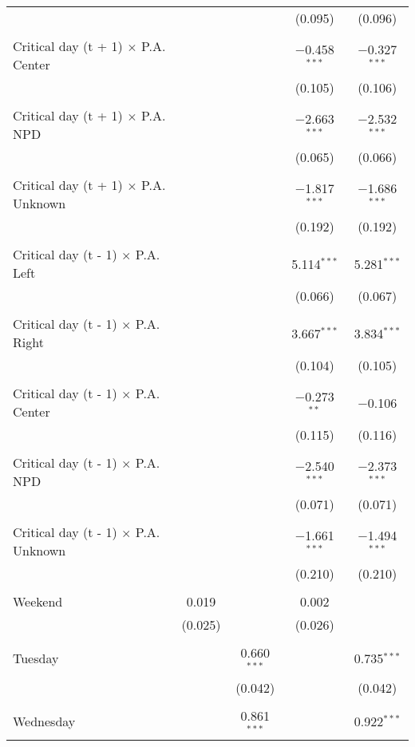 \documentclass[
]{article}
\begin{document}
\begin{table}[!htbp]
{\begin{tabular}{@{\extracolsep{5pt}}lcccc}
  &  &  & (0.095) & (0.096) \\ 
  & & & & \\ 
 Critical day (t + 1) $\times$ P.A. Center &  &  & $-$0.458$^{***}$ & $-$0.327$^{***}$ \\ 
  &  &  & (0.105) & (0.106) \\ 
  & & & & \\ 
 Critical day (t + 1) $\times$ P.A. NPD &  &  & $-$2.663$^{***}$ & $-$2.532$^{***}$ \\ 
  &  &  & (0.065) & (0.066) \\ 
  & & & & \\ 
 Critical day (t + 1) $\times$ P.A. Unknown &  &  & $-$1.817$^{***}$ & $-$1.686$^{***}$ \\ 
  &  &  & (0.192) & (0.192) \\ 
  & & & & \\ 
 Critical day (t - 1) $\times$ P.A. Left &  &  & 5.114$^{***}$ & 5.281$^{***}$ \\ 
  &  &  & (0.066) & (0.067) \\ 
  & & & & \\ 
 Critical day (t - 1) $\times$ P.A. Right &  &  & 3.667$^{***}$ & 3.834$^{***}$ \\ 
  &  &  & (0.104) & (0.105) \\ 
  & & & & \\ 
 Critical day (t - 1) $\times$ P.A. Center &  &  & $-$0.273$^{**}$ & $-$0.106 \\ 
  &  &  & (0.115) & (0.116) \\ 
  & & & & \\ 
 Critical day (t - 1) $\times$ P.A. NPD &  &  & $-$2.540$^{***}$ & $-$2.373$^{***}$ \\ 
  &  &  & (0.071) & (0.071) \\ 
  & & & & \\ 
 Critical day (t - 1) $\times$ P.A. Unknown &  &  & $-$1.661$^{***}$ & $-$1.494$^{***}$ \\ 
  &  &  & (0.210) & (0.210) \\ 
  & & & & \\ 
 Weekend & 0.019 &  & 0.002 &  \\ 
  & (0.025) &  & (0.026) &  \\ 
  & & & & \\ 
 Tuesday &  & 0.660$^{***}$ &  & 0.735$^{***}$ \\ 
  &  & (0.042) &  & (0.042) \\ 
  & & & & \\ 
 Wednesday &  & 0.861$^{***}$ &  & 0.922$^{***}$ \\ 

\end{tabular}}
\end{table}
\end{document}
